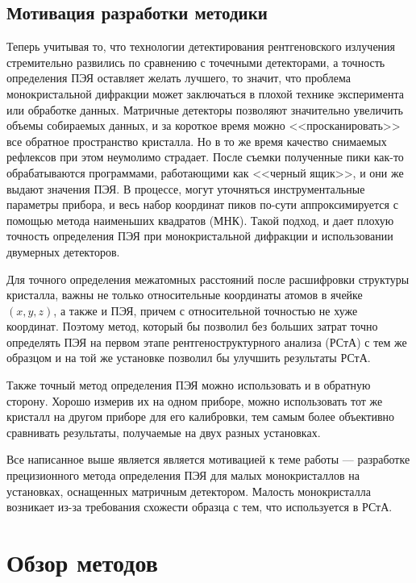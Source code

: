\documentclass[a4paper,14pt]{extarticle}
\begin{document}
\subsection{Мотивация разработки методики}

Теперь учитывая то, что технологии детектирования рентгеновского излучения стремительно развились по сравнению с точечными детекторами, а точность определения ПЭЯ оставляет желать лучшего, то значит, что проблема монокристальной дифракции может заключаться в плохой технике эксперимента или обработке данных.
Матричные детекторы позволяют значительно увеличить объемы собираемых данных, и за короткое время можно <<просканировать>> все обратное пространство кристалла.
Но в то же время качество снимаемых рефлексов при этом неумолимо страдает.
После съемки полученные пики как-то обрабатываются программами, работающими как <<черный ящик>>, и они же выдают значения ПЭЯ.
В процессе, могут уточняться инструментальные параметры прибора, и весь набор координат пиков по-сути аппроксимируется с помощью метода наименьших квадратов (МНК).
Такой подход, и дает плохую точность определения ПЭЯ при монокристальной дифракции и использовании двумерных детекторов.

Для точного определения межатомных расстояний после расшифровки структуры кристалла, важны не только относительные координаты атомов в ячейке $(x, y, z)$, а также и ПЭЯ, причем с относительной точностью не хуже координат.
Поэтому метод, который бы позволил без больших затрат точно определять ПЭЯ на первом этапе рентгеноструктурного анализа (РСтА) с тем же образцом и на той же установке позволил бы улучшить результаты РСтА.

Также точный метод определения ПЭЯ можно использовать и в обратную сторону.
Хорошо измерив их на одном приборе, можно использовать тот же кристалл на другом приборе для его калибровки, тем самым более объективно сравнивать результаты, получаемые на двух разных установках.

Все написанное выше является является мотивацией к теме работы --- разработке прецизионного метода определения ПЭЯ для малых монокристаллов на установках, оснащенных матричным детектором.
Малость монокристалла возникает из-за требования схожести образца с тем, что используется в РСтА.

\section{Обзор методов}
\end{document}
